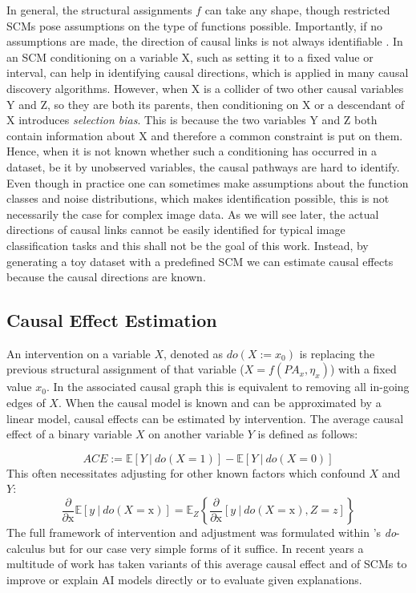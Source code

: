 In general, the structural assignments $f$ can take any shape, though restricted SCMs pose assumptions on the type of functions possible. Importantly, if no assumptions are made, the direction of causal links is not always identifiable \citep{Peters2017}. In an SCM conditioning on a variable X, such as setting it to a fixed value or interval, can help in identifying causal directions, which is applied in many causal discovery algorithms. However, when X is a collider of two other causal variables Y and Z, so they are both its parents, then conditioning on X or a descendant of X introduces \textit{selection bias}. This is because the two variables Y and Z both contain information about X and therefore a common constraint is put on them. Hence, when it is not known whether such a conditioning has occurred in a dataset, be it by unobserved variables, the causal pathways are hard to identify. 
Even though in practice one can sometimes make assumptions about the function classes and noise distributions, which makes identification possible, this is not necessarily the case for complex image data. As we will see later, the actual directions of causal links cannot be easily identified for typical image classification tasks and this shall not be the goal of this work. Instead, by generating a toy dataset with a predefined SCM we can estimate causal effects because the causal directions are known.


\subsection{Causal Effect Estimation}
An intervention on a variable $X$, denoted as $do(X := x_0)$ is replacing the previous structural assignment of that variable ($X = f(PA_x, \eta_x)$) with a fixed value $x_0$. 
In the associated causal graph this is equivalent to removing all in-going edges of $X$.
When the causal model is known and can be approximated by a linear model, causal effects can be estimated by intervention. The average causal effect of a binary variable $X$ on another variable $Y$ is defined as follows:

\begin{equation}
\displaystyle ACE := \mathbb{E} [ Y \ | \ do(X=1) ] - \mathbb{E} [ Y \ | \ do(X=0) ] 
\end{equation}
This often necessitates adjusting for other known factors which confound $X$ and $Y$:
\begin{equation}
\frac{\partial}{\partial \mathrm{x}} \mathbb{E} [ y \ | \ do(X=\mathrm{x}) ] = 
\mathbb{E}_Z \left\{ \frac{\partial}{\partial \mathrm{x}} [ y \ | \ do(X=\mathrm{x}), Z=z ] \right\}
\end{equation}
The full framework of intervention and adjustment was formulated within \citet{Pearl2009}'s \textit{do}-calculus  but for our case very simple forms of it suffice.
In recent years a multitude of work has taken variants of this average causal effect and of SCMs to improve or explain AI models directly or to evaluate given explanations. 

